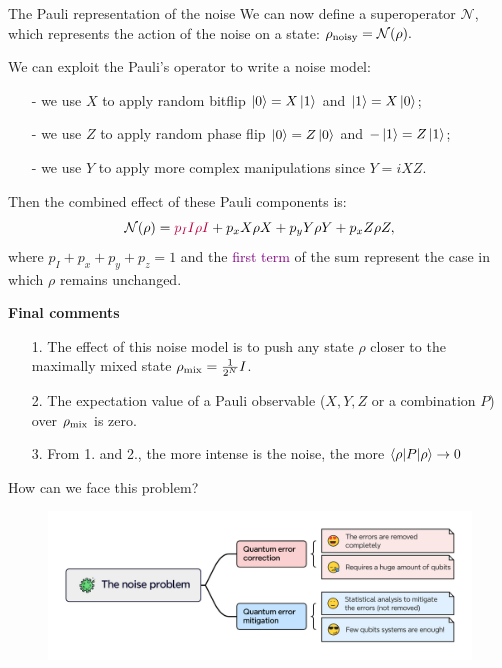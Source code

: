 \documentclass[aspectratio=169, 8pt, xcolor={svgnames}, hyperref={linkcolor=black}]{beamer}
\begin{document}
\begin{frame}{The Pauli representation of the noise}
We can now define a superoperator $\mathcal{N}$, which represents the action of the 
noise on a state:
$ \rho_{\rm noisy} = \mathcal{N}(\rho). $

We can exploit the Pauli's operator to write a noise model:
\begin{itemize}[noitemsep]
\item[-] we use $X$ to apply random bitflip $\ket{0}=X\ket{1}$ and $\ket{1}=X\ket{0}$;
\item[-] we use $Z$ to apply random phase flip $\ket{0}=Z\ket{0}$ and $-\ket{1}=Z\ket{1}$;
\item[-] we use $Y$ to apply more complex manipulations since $Y=iXZ$.
\end{itemize}
Then the combined effect of these Pauli components is:
$$ \mathcal{N}(\rho) = \textcolor{purple}{p_I I \rho I} + p_x X \rho X + p_y Y \rho Y + p_x Z \rho Z, $$
where $p_I+p_x+p_y+p_z=1$ and the \textcolor{purple}{first term} of the sum represent the 
case in which $\rho$ remains unchanged. 

\textbf{Final comments}
\vspace{-0.2cm}
\begin{itemize}[noitemsep]
\item[1.] The effect of this noise model is to push any state $\rho$ closer to the maximally mixed state $\rho_{\rm mix}=\frac{1}{2^N} I$.
\item[2.] The expectation value of a Pauli observable ($X, Y, Z$ or a combination $P$) over $\rho_{\rm mix}$ is zero.
\item[3.] From 1. and 2., the more intense is the noise, the more $\braket{\rho|P|\rho}\to 0$
\end{itemize}

\end{frame}

\begin{frame}{How can we face this problem?}
\begin{figure}
    \includegraphics[width=1\textwidth]{figures/qem_qec.pdf}
\end{figure}
\end{frame}
\end{document}
